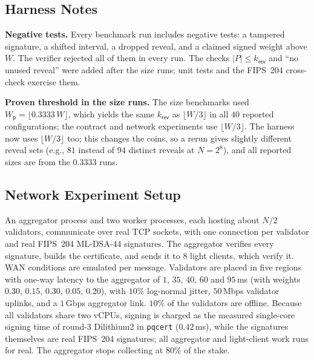 \documentclass[10pt,journal,compsoc]{IEEEtran}
\theoremstyle{tplain}
\theoremstyle{tdef}
\theoremstyle{remark}
\newcommand{\Wp}{W_{\mathsf{p}}}
\newcommand{\kr}{k_{\mathsf{rev}}}
\begin{document}
\subsection{Harness Notes}\label{S-eval-harness}
\noindent\textbf{Negative tests.} Every benchmark run includes negative tests: a tampered signature, a shifted interval, a dropped reveal, and a claimed signed weight above $W$. The verifier rejected all of them in every run. The checks $|P|\le\kr$ and ``no unused reveal'' were added after the size runs; unit tests and the FIPS~204 cross-check exercise them.

\noindent\textbf{Proven threshold in the size runs.} The size benchmarks used $\Wp=\lfloor 0.3333\,W\rfloor$, which yields the same $\kr$ as $\lfloor W/3\rfloor$ in all $40$ reported configurations; the contract and network experiments use $\lfloor W/3\rfloor$. The harness now uses $\lfloor W/3\rfloor$ too; this changes the coins, so a rerun gives slightly different reveal sets (e.g., $81$ instead of $94$ distinct reveals at $N=2^8$), and all reported sizes are from the $0.3333$ runs.

\subsection{Network Experiment Setup}\label{S-eval-network}
An aggregator process and two worker processes, each hosting about $N/2$ validators, communicate over real TCP sockets, with one connection per validator and real FIPS~204 ML-DSA-44 signatures. The aggregator verifies every signature, builds the certificate, and sends it to $8$ light clients, which verify it. WAN conditions are emulated per message. Validators are placed in five regions with one-way latency to the aggregator of $1$, $35$, $40$, $60$ and $95$\,ms (with weights $0.30$, $0.15$, $0.30$, $0.05$, $0.20$), with $10\%$ log-normal jitter, $50$\,Mbps validator uplinks, and a $1$\,Gbps aggregator link. $10\%$ of the validators are offline. Because all validators share two vCPUs, signing is charged as the measured single-core signing time of round-3 Dilithium2 in \texttt{pqcert} ($0.42$\,ms), while the signatures themselves are real FIPS~204 signatures; all aggregator and light-client work runs for real. The aggregator stops collecting at $80\%$ of the stake.
\end{document}
